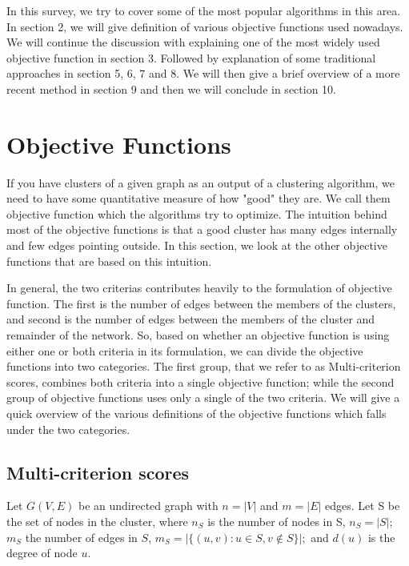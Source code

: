 \documentclass[letterpaper]{article}
\begin{document}
In this survey, we try to cover some of the most popular algorithms in this
area. %
In section 2, we will give definition of various objective functions used
nowadays. We will continue the discussion with explaining one of the most widely
used objective function in section 3. Followed by explanation of some
traditional approaches in section 5, 6, 7 and 8. We will then give a brief
overview of a more recent method in section 9 and then we will conclude in
section 10.
\section{Objective Functions}
If you have clusters of a given graph as an output of a clustering algorithm,
we need to have some quantitative measure of how "good" they are. We call them
objective function which the algorithms try to optimize. The intuition behind
most of the objective functions is that a good cluster has many edges
internally and few edges pointing outside. In this section, we look at the
other objective functions that are based on this intuition.


In general, the two criterias contributes heavily to the formulation of
objective function. The first is the number of edges between the members of the
clusters, and second is the number of edges between the members of the cluster
and remainder of the network. So, based on whether an objective function is
using either one or both criteria in its formulation, we can divide the
objective functions into two categories\cite{leskovec2010}. The first group,
that we refer to as Multi-criterion scores, combines both criteria into a
single objective function; while the second group of objective functions uses
only  a single of the two criteria. We will give a quick overview of the
various definitions of the objective functions which falls under the two
categories.


\subsection{Multi-criterion scores}
Let $G(V,E)$ be an undirected graph with $n=|V|$ and $m=|E|$ edges. Let S be the set of nodes in the cluster, where $n_S$ is the number of nodes in S,
$n_S=|S|$; $m_S$ the number of edges in $S$,  $m_S=|\{(u,v):u\in S, v\notin S\}|;$ and $d(u)$ is the degree of node $u$.
\end{document}
